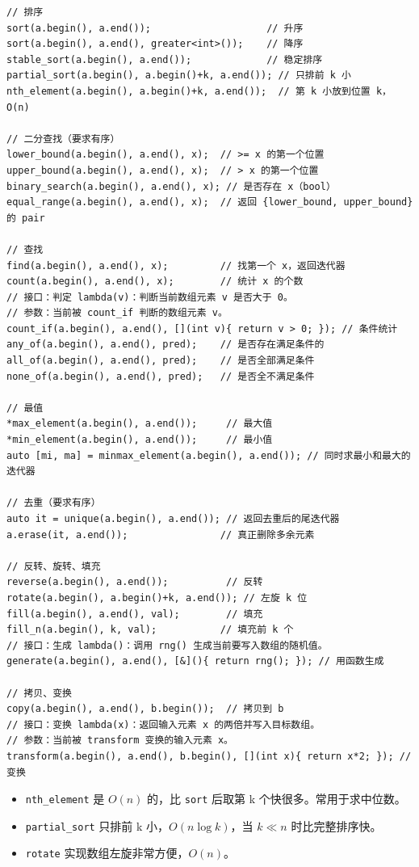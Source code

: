 \documentclass[UTF8,openany,oneside,zihao=-4]{ctexbook}
\begin{document}
\begin{lstlisting}
// 排序
sort(a.begin(), a.end());                    // 升序
sort(a.begin(), a.end(), greater<int>());    // 降序
stable_sort(a.begin(), a.end());             // 稳定排序
partial_sort(a.begin(), a.begin()+k, a.end()); // 只排前 k 小
nth_element(a.begin(), a.begin()+k, a.end());  // 第 k 小放到位置 k，O(n)

// 二分查找（要求有序）
lower_bound(a.begin(), a.end(), x);  // >= x 的第一个位置
upper_bound(a.begin(), a.end(), x);  // > x 的第一个位置
binary_search(a.begin(), a.end(), x); // 是否存在 x（bool）
equal_range(a.begin(), a.end(), x);  // 返回 {lower_bound, upper_bound} 的 pair

// 查找
find(a.begin(), a.end(), x);         // 找第一个 x，返回迭代器
count(a.begin(), a.end(), x);        // 统计 x 的个数
// 接口：判定 lambda(v)：判断当前数组元素 v 是否大于 0。
// 参数：当前被 count_if 判断的数组元素 v。
count_if(a.begin(), a.end(), [](int v){ return v > 0; }); // 条件统计
any_of(a.begin(), a.end(), pred);    // 是否存在满足条件的
all_of(a.begin(), a.end(), pred);    // 是否全部满足条件
none_of(a.begin(), a.end(), pred);   // 是否全不满足条件

// 最值
*max_element(a.begin(), a.end());     // 最大值
*min_element(a.begin(), a.end());     // 最小值
auto [mi, ma] = minmax_element(a.begin(), a.end()); // 同时求最小和最大的迭代器

// 去重（要求有序）
auto it = unique(a.begin(), a.end()); // 返回去重后的尾迭代器
a.erase(it, a.end());                // 真正删除多余元素

// 反转、旋转、填充
reverse(a.begin(), a.end());          // 反转
rotate(a.begin(), a.begin()+k, a.end()); // 左旋 k 位
fill(a.begin(), a.end(), val);        // 填充
fill_n(a.begin(), k, val);           // 填充前 k 个
// 接口：生成 lambda()：调用 rng() 生成当前要写入数组的随机值。
generate(a.begin(), a.end(), [&](){ return rng(); }); // 用函数生成

// 拷贝、变换
copy(a.begin(), a.end(), b.begin());  // 拷贝到 b
// 接口：变换 lambda(x)：返回输入元素 x 的两倍并写入目标数组。
// 参数：当前被 transform 变换的输入元素 x。
transform(a.begin(), a.end(), b.begin(), [](int x){ return x*2; }); // 变换
\end{lstlisting}

\begin{tip}
\begin{itemize}
  \item \lstinline|nth_element| 是 $O(n)$ 的，比 \lstinline|sort| 后取第 k 个快很多。常用于求中位数。
  \item \lstinline|partial_sort| 只排前 k 小，$O(n \log k)$，当 $k \ll n$ 时比完整排序快。
  \item \lstinline|rotate| 实现数组左旋非常方便，$O(n)$。
\end{itemize}
\end{tip}
\end{document}
